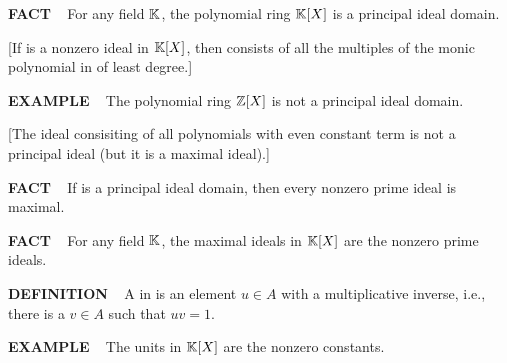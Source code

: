 \begin{x}{\small\bf FACT} \ %
For any field $\mathbb{K}$, the polynomial ring $\mathbb{K}[X]$ is a principal ideal domain.

\vspace{0.1cm}

[If \mI is a nonzero ideal in $\mathbb{K}[X]$, then \mI consists of all the multiples of the monic polynomial in \mI of least degree.]
\end{x}

\vspace{0.1cm}

\begin{x}{\small\bf EXAMPLE} \ %
The polynomial ring $\mathbb{Z}[X]$ is not a principal ideal domain.

\vspace{0.1cm}

[The ideal \mI consisiting of all polynomials with even constant term is not a principal ideal (but it is a maximal ideal).]
\end{x}

\vspace{0.1cm}



\begin{x}{\small\bf FACT} \ %
If \mA is a principal ideal domain, then every nonzero prime ideal is maximal.
\end{x}

\vspace{0.1cm}


\begin{x}{\small\bf FACT} \ %
For any field $\mathbb{K}$, the maximal ideals in $\mathbb{K}[X]$ are the nonzero prime ideals.
\end{x}

\vspace{0.1cm}


\begin{x}{\small\bf DEFINITION} \ %
A 
in \mA is an element $u \in A$ with a multiplicative inverse, i.e., there is a $v \in A$ such that $u v = 1$.
\end{x}

\vspace{0.1cm}


\begin{x}{\small\bf EXAMPLE} \ %
The units in $\mathbb{K}[X]$ are the nonzero constants.
\end{x}

\vspace{0.1cm}


